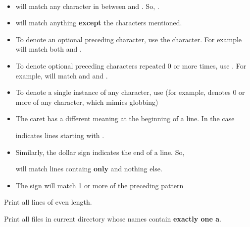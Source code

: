 \documentclass[english, 11pt]{article}
\begin{document}
   \begin{notation} \
     \begin{itemize}
       \item \tc{[$a_1a_2a_3\ldots a_n$]} will match any character  in between \tc{[} and \tc{]}. So, .
       \item \tc{[\^{}$a_1\ldots a_n$]} will match anything \textbf{except} the characters mentioned.
       \item To denote an optional preceding character, use the \tc{?} character. For example  will match both  and .
       \item To denote optional preceding characters repeated 0 or more times, use \tc{*}. For example, \tc{cs*246} will match \tc{cs246} and  and .
       \item To denote a single instance of any character, use \tc{.} (for example, \tc{.*} denotes 0 or more of any character, which mimics globbing)
       \item The caret \tc{\^{}} has a different meaning at the beginning of a line. In the case
       \begin{center}
       \end{center}
       indicates lines starting with .
       \item Similarly, the dollar sign \tc{\$} indicates the end of a line. So,
       \begin{center}
       \end{center}
       will match lines containg \textbf{only}  and nothing else.
       \item The \tc{+} sign will match 1 or more of the preceding pattern
     \end{itemize}
   \end{notation}
   \begin{exmp}
     Print all lines of even length.
     \begin{center}
     \end{center}
   \end{exmp}
   \begin{exmp}
     Print all files in current directory whose names contain \textbf{exactly one a}.
     \begin{center}
     \end{center}
   \end{exmp}
\end{document}
